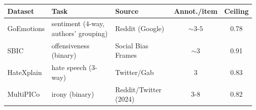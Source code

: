\begin{tabular}{@{}l l l c c@{}}
\toprule
Dataset & Task & Source & Annot./item & Ceiling \\
\midrule
GoEmotions & sentiment (4-way, authors' grouping) & Reddit (Google) & ${\sim}3$-$5$ & 0.78 \\
SBIC & offensiveness (binary) & Social Bias Frames & ${\sim}3$ & 0.91 \\
HateXplain & hate speech (3-way) & Twitter/Gab & $3$ & 0.83 \\
MultiPICo & irony (binary) & Reddit/Twitter (2024) & $3$-$8$ & 0.82 \\
\bottomrule
\end{tabular}
